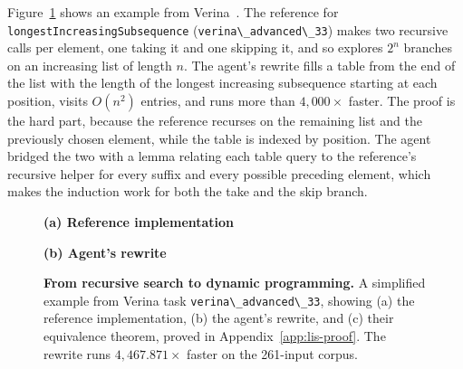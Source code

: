 \documentclass{article}
\newcommand{\code}[1]{\lstinline|#1|}
\newcommand{\verina}{Verina\xspace}
\begin{document}
Figure~\ref{fig:task-format} shows an example from \verina{}~\citep{ye2026verina}.
The reference for \code{longestIncreasingSubsequence} (\code{verina\_advanced\_33}) makes two recursive calls per element, one taking it and one skipping it, and so explores $2^n$ branches on an increasing list of length $n$.
The agent's rewrite fills a table from the end of the list with the length of the longest increasing subsequence starting at each position, visits $O(n^2)$ entries, and runs more than $4{,}000\times$ faster.
The proof is the hard part, because the reference recurses on the remaining list and the previously chosen element, while the table is indexed by position.
The agent bridged the two with a lemma relating each table query to the reference's recursive helper for every suffix and every possible preceding element, which makes the induction work for both the take and the skip branch.

\begin{figure}[t]
\begin{tcolorbox}[colback=white,colframe=black!65,boxrule=0.4pt,arc=6pt,boxsep=0pt,left=7pt,right=7pt,top=6pt,bottom=6pt]
\noindent\begin{minipage}[t][184pt][t]{0.485\linewidth}
\vspace{0pt}
{\footnotesize\bfseries (a) Reference implementation}

\end{minipage}\hfill
\begin{minipage}[t][184pt][t]{0.485\linewidth}
\vspace{0pt}
{\footnotesize\bfseries (b) Agent's rewrite}

\end{minipage}

\smallskip
{}

\end{tcolorbox}
\caption{\textbf{From recursive search to dynamic programming.} A simplified example from \verina{} task \code{verina\_advanced\_33}, showing (a) the reference implementation, (b) the agent's rewrite, and (c) their equivalence theorem, proved in Appendix~\ref{app:lis-proof}. The rewrite runs $4{,}467.871\times$ faster on the 261-input corpus.}
\label{fig:task-format}
\end{figure}
\end{document}
